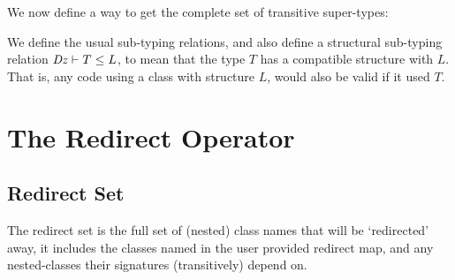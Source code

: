We now define a way to get the complete set of transitive super-types:

\begin{defs}
\end{defs}

We define the usual sub-typing relations, and also define a structural sub-typing relation $\mathit{Dz} \vdash T \leq L$, to mean that the type $T$ has a compatible structure with $L$. That is, any code using a class with structure $L$, would also be valid if it used $T$.

\begin{defs}
{}
\end{defs}

\section{The Redirect Operator}

\subsection{Redirect Set}
The redirect set is the full set of (nested) class names that will be `redirected' away, it includes the classes named in the user provided redirect map, and any nested-classes their signatures (transitively) depend on.

